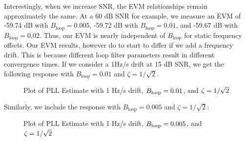 \documentclass{article}
\begin{document}
Interestingly, when we increase SNR, the EVM relationships remain approximately the same. At a 60 dB SNR for example, we measure an EVM of -59.74 dB with $B_{\text{loop}} = 0.005$, -59.72 dB with $B_{\text{loop}} = 0.01$, and -59.67 dB with $B_{\text{loop}} = 0.02$. Thus, our EVM is nearly independent of $B_{\text{loop}}$ for static frequency offsets. Our EVM results, however do to start to differ if we add a frequency drift. This is because different loop filter parameters result in different convergence times. If we consider a 1Hz/s drift at 15 dB SNR, we get the following response with $B_{\text{loop}} = 0.01$ and $\zeta = 1/\sqrt{2}$.

\begin{figure}[H]
	\centerline{}
	\caption{Plot of PLL Estimate with 1 Hz/s drift, $\protect{B_\text{loop}} = 0.01$, and $\protect{\zeta = 1/\sqrt{2}}$}
	\label{fig::convergence_1Hz_drift_Bloop_0p01_damp_sqrt_2}
\end{figure}

\noindent Similarly, we include the response with $B_{\text{loop}} = 0.005$ and $\zeta = 1/\sqrt{2}$:

\begin{figure}[H]
	\centerline{}
	\caption{Plot of PLL Estimate with 1 Hz/s drift, $\protect{B_\text{loop}} = 0.005$, and $\protect{\zeta = 1/\sqrt{2}}$}
	\label{fig::convergence_1Hz_drift_Bloop_0p005_damp_sqrt_2}
\end{figure}
\end{document}
